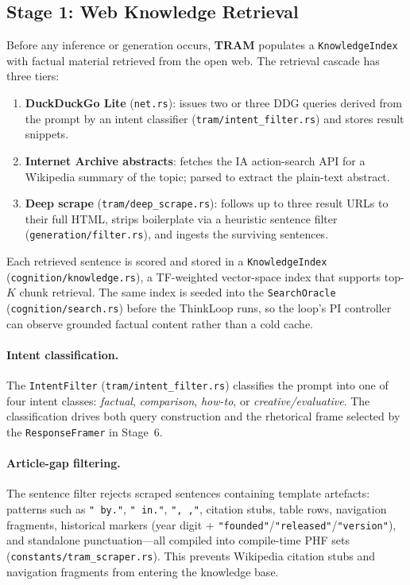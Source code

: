 \documentclass[11pt,a4paper]{article}
\newcommand{\tram}{\texorpdfstring{%
  \textbf{\color{lmmTeal}TRAM}}{TRAM}}
\begin{document}
\subsection{Stage 1: Web Knowledge Retrieval}
\label{sec:retrieval}

Before any inference or generation occurs, \tram{} populates a \texttt{KnowledgeIndex} with
factual material retrieved from the open web. The retrieval cascade has three tiers:

\begin{enumerate}[noitemsep,topsep=4pt]
  \item \textbf{DuckDuckGo Lite} (\texttt{net.rs}): issues two or three DDG queries derived
        from the prompt by an intent classifier (\texttt{tram/intent\_filter.rs}) and stores
        result snippets.
  \item \textbf{Internet Archive abstracts}: fetches the IA action-search API for a Wikipedia
        summary of the topic; parsed to extract the plain-text abstract.
  \item \textbf{Deep scrape} (\texttt{tram/deep\_scrape.rs}): follows up to three result URLs
        to their full HTML, strips boilerplate via a heuristic sentence filter
        (\texttt{generation/filter.rs}), and ingests the surviving sentences.
\end{enumerate}

Each retrieved sentence is scored and stored in a \texttt{KnowledgeIndex}
(\texttt{cognition/knowledge.rs}), a TF-weighted vector-space index that supports top-$K$ chunk
retrieval. The same index is seeded into the \texttt{SearchOracle}
(\texttt{cognition/search.rs}) before the ThinkLoop runs, so the loop's PI controller can observe
grounded factual content rather than a cold cache.

\paragraph{Intent classification.}
The \texttt{IntentFilter} (\texttt{tram/intent\_filter.rs}) classifies the prompt into one of
four intent classes: \textit{factual}, \textit{comparison}, \textit{how-to}, or
\textit{creative/evaluative}. The classification drives both query construction and the
rhetorical frame selected by the \texttt{ResponseFramer} in Stage~6.

\paragraph{Article-gap filtering.}
The sentence filter rejects scraped sentences containing template artefacts: patterns such as
\texttt{" by."}, \texttt{" in."}, \texttt{", ,"}, citation stubs, table rows, navigation
fragments, historical markers (year digit + \texttt{"founded"}/\texttt{"released"}/\texttt{"version"}),
and standalone punctuation---all compiled into compile-time PHF sets
(\texttt{constants/tram\_scraper.rs}). This prevents Wikipedia citation stubs and navigation
fragments from entering the knowledge base.
\end{document}
